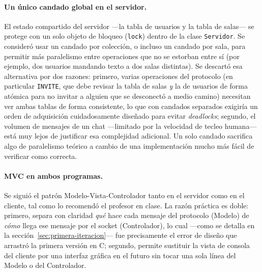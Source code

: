 \documentclass[11pt,letterpaper]{article}
\begin{document}
\paragraph{Un único candado global en el servidor.} El estado compartido
del servidor —la tabla de usuarios y la tabla de salas— se protege con un
solo objeto de bloqueo (\texttt{lock}) dentro de la clase \texttt{Servidor}.
Se consideró usar un candado por colección, o incluso un candado por sala,
para permitir más paralelismo entre operaciones que no se estorban entre sí
(por ejemplo, dos usuarios mandando texto a dos salas distintas). Se
descartó esa alternativa por dos razones: primero, varias operaciones del
protocolo (en particular \texttt{INVITE}, que debe revisar la tabla de
salas \emph{y} la de usuarios de forma atómica para no invitar a alguien
que se desconectó a medio camino) necesitan ver ambas tablas de forma
consistente, lo que con candados separados exigiría un orden de adquisición
cuidadosamente diseñado para evitar \emph{deadlocks}; segundo, el volumen de
mensajes de un chat —limitado por la velocidad de tecleo humana— está muy
lejos de justificar esa complejidad adicional. Un solo candado sacrifica
algo de paralelismo teórico a cambio de una implementación mucho más fácil
de verificar como correcta.

\paragraph{MVC en ambos programas.} Se siguió el patrón Modelo-Vista-Controlador
tanto en el servidor como en el cliente, tal como lo recomendó el
profesor en clase. La razón práctica es doble: primero, separa con
claridad \emph{qué} hace cada mensaje del protocolo (Modelo) de \emph{cómo}
llega ese mensaje por el socket (Controlador), lo cual —como se detalla en
la sección~\ref{sec:primera-iteracion}— fue precisamente el error de diseño
que arrastró la primera versión en C; segundo, permite sustituir la vista de
consola del cliente por una interfaz gráfica en el futuro sin tocar una sola
línea del Modelo o del Controlador.
\end{document}
